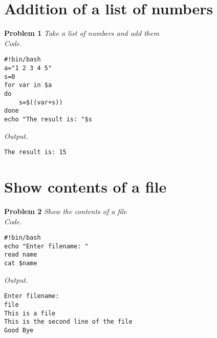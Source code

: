 \documentclass[12pt]{article}
\date{ }
\begin{document}
\tableofcontents

\newpage

\setlength{\fboxrule}{.5mm}\setlength{\fboxsep}{1.2mm}
\newlength{\boxlength}\setlength{\boxlength}{\textwidth}
\addtolength{\boxlength}{-4mm}
\begin{center}\end{center}
\vspace{5mm}

\section{Addition of a list of numbers}

\textbf{Problem 1} \textit{Take a list of numbers and add them}\\

\textit{Code.}

\begin{lstlisting}
#!bin/bash
a="1 2 3 4 5"
s=0
for var in $a
do
	s=$((var+s))
done
echo "The result is: "$s

\end{lstlisting}

\textit{Output.}
\begin{lstlisting}
The result is: 15
\end{lstlisting}

\section{Show contents of a file}

\textbf{Problem 2} \textit{Show the contents of a file}\\

\textit{Code.}

\begin{lstlisting}
#!bin/bash
echo "Enter filename: "
read name
cat $name

\end{lstlisting}

\textit{Output.}
\begin{lstlisting}
Enter filename: 
file
This is a file
This is the second line of the file
Good Bye
\end{lstlisting}
\end{document}

